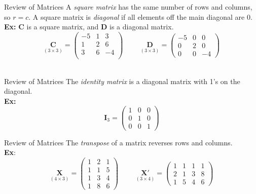 \documentclass[11pt]{beamer}
\begin{document}
\begin{frame}{Review of Matrices}
A \emph{square matrix} has the same number of rows and columns, so $r=c$.  A square matrix is \emph{diagonal} if all elements off the main diagonal are 0.\\
\vspace{12pt}
\textbf{Ex:} $\bm{C}$ is a square matrix, and $\bm{D}$ is a diagonal matrix.
\[
\underset{(3 \times 3)}{\bm{C}} =
\begin{pmatrix}
-5 & 1 & 3\\
1 & 2 & 6\\
3 & 6 & -4\\
\end{pmatrix}
\hspace{1cm}
\underset{(3 \times 3)}{\bm{D}} =
\begin{pmatrix}
-5 & 0 & 0\\
0 & 2 & 0\\
0 & 0 & -4
\end{pmatrix}
\]\\
\end{frame}

\begin{frame}{Review of Matrices}
The \emph{identity matrix} is a diagonal matrix with 1's on the diagonal.\\
\vspace{12pt}
\textbf{Ex:}
\[
\bm{I}_3 =
\begin{pmatrix}
1 & 0 & 0\\
0 & 1 & 0\\
0 & 0 & 1
\end{pmatrix}
\]
\clearpage
\end{frame}

\begin{frame}{Review of Matrices}
The \emph{transpose} of a matrix reverses rows and columns.\\
\vspace{12pt}
\textbf{Ex}:
\[
\underset{(4 \times 3)}{\bm{X}} =
\begin{pmatrix}
1 & 2 & 1\\
1 & 1 & 5\\
1 & 3 & 4\\
1 & 8 & 6
\end{pmatrix}
\hspace{1cm}
\underset{(3 \times 4)}{\bm{X'}} =
\begin{pmatrix}
1 & 1 & 1 & 1\\
2 & 1 & 3 & 8\\
1 & 5 & 4 & 6
\end{pmatrix}
\]
\end{frame}
\end{document}
